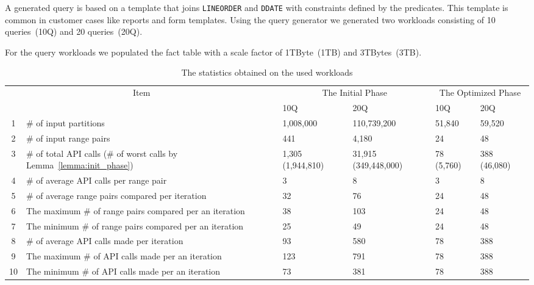 \documentclass[runningheads]{comsis2}
\begin{document}
A generated query is based on a template that joins {\tt LINEORDER} and 
{\tt DDATE} with constraints defined by the predicates. 
This template is common in customer cases like reports and form 
templates. 
Using the query generator we generated two workloads consisting of 10 queries~(10Q) and 20 queries~(20Q). 

For the query workloads we populated the fact table with a scale factor of 1TByte~(1TB) and 3TBytes~(3TB).

\begin{table}[t]
\caption{The statistics obtained on the used workloads\label{tab:workload_stat}}
\begin{center}
{\scriptsize %
\begin{tabular}{|c|l|l|l|l|l|} \hline
\multicolumn{2}{|c|}{\multirow{2}{*}{Item}} & \multicolumn{2}{|c|}{The Initial Phase} & \multicolumn{2}{|c|}{The Optimized Phase} \\ \cline{3-6}
 \multicolumn{2}{|c|}{} & 10Q & 20Q & 10Q & 20Q \\ \hline
1 & {\# of input partitions}  	 & 1,008,000 & 110,739,200 & 51,840 & 59,520 \\ \hline
2 & {\# of input range pairs} 	 & 441 & 4,180 & 24 & 48\\ \hline
3 & {\# of total API calls (\# of worst calls by Lemma~\ref{lemma:init_phase}})   & 1,305 (1,944,810) & 31,915 (349,448,000) & 78 (5,760) & 388 (46,080) \\ \hline
4 & {\# of average API calls per range pair} 	& 3 & 8 & 3 & 8 \\ \hline
5 & {\# of average range pairs compared per iteration} 	   & 32 & 76 & 24 & 48 \\ \hline
6 & {The maximum \# of range pairs compared per an iteration} & 38 & 103 & 24 & 48 \\ \hline
7 &{The minimum \# of range pairs compared per an iteration} & 25 & 49 & 24 & 48\\ \hline
8 & {\# of average API calls made per iteration}		   & 93 & 580 & 78 & 388 \\ \hline
9 & {The maximum \# of API calls made per an iteration} 	   & 123 & 791 & 78 & 388 \\ \hline
10 & {The minimum \# of API calls made per an iteration} 	   & 73 & 381 & 78 & 388 \\ \hline
\end{tabular}
}
\end{center}
\vspace{-0.3in}
\end{table}
\end{document}
